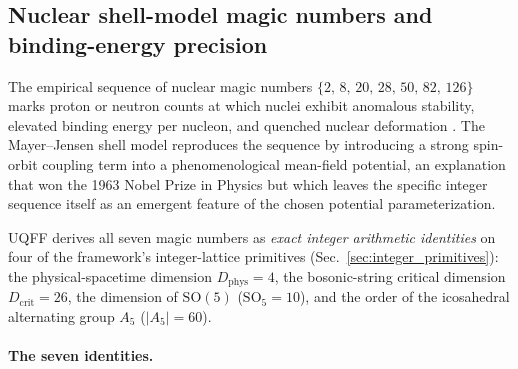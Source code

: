 
\subsection{Nuclear shell-model magic numbers and binding-energy precision}
\label{sec:magic_numbers}

The empirical sequence of nuclear magic numbers
$\{2,\,8,\,20,\,28,\,50,\,82,\,126\}$ marks proton or neutron counts at
which nuclei exhibit anomalous stability, elevated binding energy per
nucleon, and quenched nuclear deformation \cite{MayerJensen1955,
GoeppertMayer1948, HaxelJensenSuess1949}. The Mayer--Jensen shell model
reproduces the sequence by introducing a strong spin-orbit coupling term
into a phenomenological mean-field potential, an explanation that won
the 1963 Nobel Prize in Physics but which leaves the specific integer
sequence itself as an emergent feature of the chosen potential
parameterization.

UQFF derives all seven magic numbers as \emph{exact integer arithmetic
identities} on four of the framework's integer-lattice primitives
(Sec.~\ref{sec:integer_primitives}): the physical-spacetime dimension
$D_{\text{phys}}=4$, the bosonic-string critical dimension
$D_{\text{crit}}=26$, the dimension of $\mathrm{SO}(5)$
($\mathrm{SO}_5 = 10$), and the order of the icosahedral alternating
group $A_5$ ($|A_5|=60$).

\paragraph{The seven identities.}

